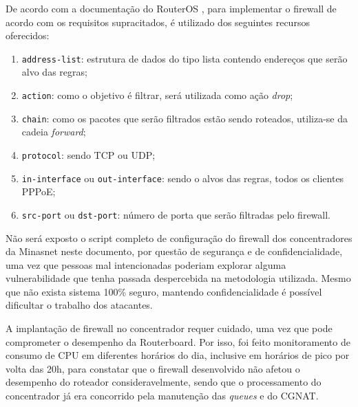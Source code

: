     De acordo com a documentação do RouterOS \cite{fwmikrotik}, para implementar o firewall de acordo com os requisitos supracitados, é utilizado dos seguintes recursos oferecidos:
    
    \begin{enumerate}[label=\alph*)]
        \item {\tt address-list}: estrutura de dados do tipo lista contendo endereços que serão alvo das regras;
        \item {\tt action}: como o objetivo é filtrar, será utilizada como ação \textit{drop};
        \item {\tt chain}: como os pacotes que serão filtrados estão sendo roteados, utiliza-se da cadeia \textit{forward};
        \item {\tt protocol}: sendo TCP ou UDP;
        \item {\tt in-interface} ou {\tt out-interface}: sendo o alvos das regras, todos os clientes PPPoE;
        \item {\tt src-port} ou {\tt dst-port}: número de porta que serão filtradas pelo firewall.
    \end{enumerate}
    
    Não será exposto o script completo de configuração do firewall dos concentradores da Minasnet neste documento, por questão de segurança e de confidencialidade, uma vez que pessoas mal intencionadas poderiam explorar alguma vulnerabilidade que tenha passada despercebida na metodologia utilizada. Mesmo que não exista sistema 100\% seguro, mantendo confidencialidade é possível dificultar o trabalho dos atacantes. 
    
    A implantação de firewall no concentrador requer cuidado, uma vez que pode comprometer o desempenho da Routerboard. Por isso, foi feito monitoramento de consumo de CPU em diferentes horários do dia, inclusive em horários de pico por volta das 20h, para constatar que o firewall desenvolvido não afetou o desempenho do roteador consideravelmente, sendo que o processamento do concentrador já era concorrido pela manutenção das \textit{queues} e do CGNAT.
